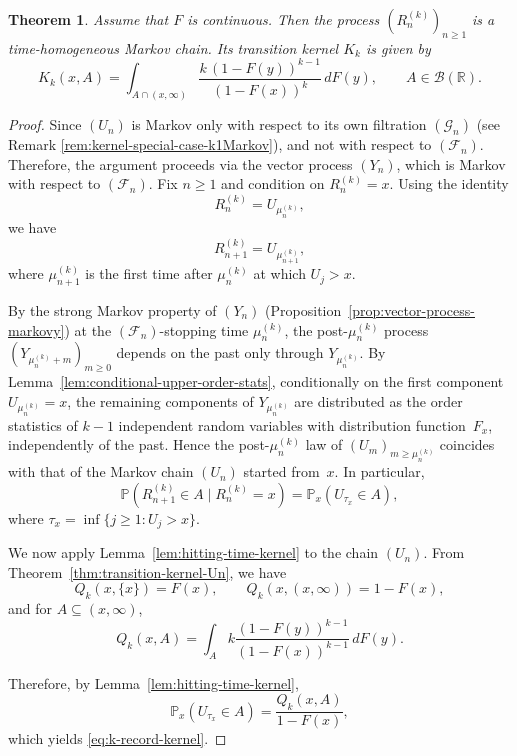 \documentclass[12pt]{article}
\newtheorem{theorem}{Theorem}[section]
\theoremstyle{definition}
\begin{document}
\begin{theorem}
\label{thm:k-record-kernel}
Assume that $F$ is continuous. Then the process $(R_n^{(k)})_{n\ge1}$ is a time-homogeneous Markov chain. Its transition kernel $K_k$ is given by
\begin{equation}
\label{eq:k-record-kernel}
K_k(x,A)
=
\int_{A\cap(x,\infty)}
\frac{k\,(1-F(y))^{k-1}}{(1-F(x))^k}\, dF(y),
\qquad A\in\mathcal{B}(\mathbb{R}).
\end{equation}
\end{theorem}
\begin{proof}
Since $(U_n)$ is Markov only with respect to its own filtration $(\mathcal G_n)$  (see Remark \ref{rem:kernel-special-case-k1Markov}), and not with respect to $(\mathcal F_n)$. Therefore, the argument proceeds via the vector process $(Y_n)$, which is Markov with respect to $(\mathcal F_n)$.
Fix $n\ge1$ and condition on $R_n^{(k)}=x$. Using the identity
\[
R_n^{(k)} = U_{\mu_n^{(k)}},
\]
we have
\[
R_{n+1}^{(k)} = U_{\mu_{n+1}^{(k)}},
\]
where $\mu_{n+1}^{(k)}$ is the first time after $\mu_n^{(k)}$ at which $U_j>x$.

By the strong Markov property of $(Y_n)$
(Proposition~\ref{prop:vector-process-markovy}) at the $(\mathcal F_n)$-stopping time $\mu_n^{(k)}$, the post-$\mu_n^{(k)}$ process
$(Y_{\mu_n^{(k)}+m})_{m\ge0}$ depends on the past only through
$Y_{\mu_n^{(k)}}$.  By Lemma~\ref{lem:conditional-upper-order-stats},
conditionally on the first component $U_{\mu_n^{(k)}}=x$, the remaining
components of $Y_{\mu_n^{(k)}}$ are distributed as the order statistics
of $k-1$ independent random variables with distribution function~$F_x$,
independently of the past.  Hence the post-$\mu_n^{(k)}$ law of
$(U_m)_{m\ge\mu_n^{(k)}}$ coincides with that of the Markov chain
$(U_n)$ started from~$x$.  In particular,
\[
\mathbb{P}(R_{n+1}^{(k)}\in A \mid R_n^{(k)}=x)
=
\mathbb{P}_x(U_{\tau_x}\in A),
\]
where $\tau_x=\inf\{j\ge1:U_j>x\}$.

We now apply Lemma~\ref{lem:hitting-time-kernel} to the chain $(U_n)$. From Theorem~\ref{thm:transition-kernel-Un}, we have
\[
Q_k(x,\{x\}) = F(x), \qquad Q_k(x,(x,\infty)) = 1-F(x),
\]
and for $A\subseteq(x,\infty)$,
\[
Q_k(x,A)
=
\int_A k\frac{(1-F(y))^{k-1}}{(1-F(x))^{k-1}}\, dF(y).
\]

Therefore, by Lemma~\ref{lem:hitting-time-kernel},
\[
\mathbb{P}_x(U_{\tau_x}\in A)
=
\frac{Q_k(x,A)}{1-F(x)},
\]
which yields \eqref{eq:k-record-kernel}.
\end{proof}
\end{document}

